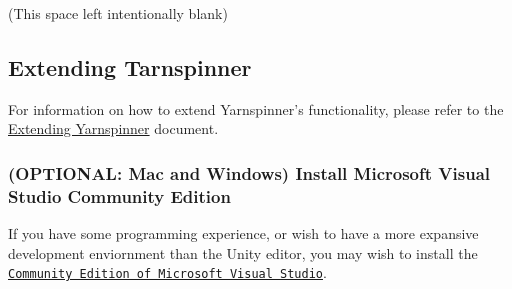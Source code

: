 (This space left intentionally blank)

\subsection*{Extending Tarnspinner}

For information on how to extend Yarnspinner's functionality, please refer to the \hyperlink{a00176}{Extending Yarnspinner} document.

\subsubsection*{(O\-P\-T\-I\-O\-N\-A\-L\-: Mac and Windows) Install Microsoft Visual Studio Community Edition}

If you have some programming experience, or wish to have a more expansive development enviornment than the Unity editor, you may wish to install the \href{https://www.visualstudio.com/downloads/}{\tt Community Edition of Microsoft Visual Studio}. 